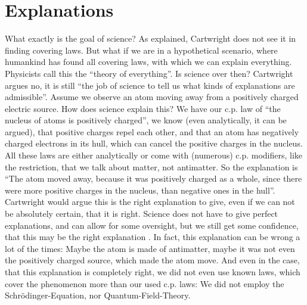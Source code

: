 \section*{Explanations}
What exactly is the goal of science?
As explained, Cartwright does not see it in finding covering laws.
But what if we are in a hypothetical scenario, where humankind has
found all covering laws, with which we can explain everything.
Physicists call this the \enquote{theory of everything}.
Is science over then?
Cartwright argues no, it is still
\enquote{the job of science to tell us what kinds of explanations are admissible}\cite[7]{cartwright1980truth}.
Assume we observe an atom moving away from a positively charged electric source.
How does science explain this?
We have our c.p. law of \enquote{the nucleus of atoms is positively charged},
we know (even analytically, it can be argued), that positive charges
repel each other, and that an atom has negatively charged electrons in its hull,
which can cancel the positive charges in the nucleus.
All these laws are either analytically or come with (numerous) c.p. modifiers, like
the restriction, that we talk about matter, not antimatter.
So the explanation is
\enquote{The atom moved away, because it was positively charged as a whole, since there
    were more positive charges in the nucleus, than negative ones in the hull}.
Cartwright would argue this is the right explanation to give, even if we
can not be absolutely certain, that it is right.
Science does not have to give perfect explanations, and can allow for some oversight,
but we still get some confidence, that this may be the right explanation \cite[7,8]{cartwright1980truth}.
In fact, this explanation can be wrong a lot of the times: Maybe the atom is made of antimatter,
maybe it was not even the positively charged source, which made the atom move.
And even in the case, that this explanation is completely right, we did not even
use known laws, which cover the phenomenon more than our used c.p. laws:
We did not employ the Schrödinger-Equation, nor Quantum-Field-Theory.


